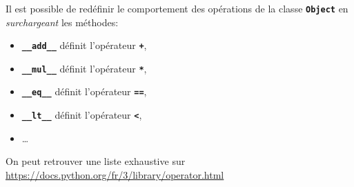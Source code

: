 \documentclass[svgnames,11pt]{beamer}
\begin{document}
\begin{frame}
    \frametitle{}
    Il est possible de redéfinir le comportement des opérations de la classe \textbf{\texttt{Object}} en \emph{surchargeant} les méthodes:
    \begin{itemize}
        \item  \textbf{\texttt{\_\_add\_\_}} définit l'opérateur \textbf{\texttt{+}},
        \item  \textbf{\texttt{\_\_mul\_\_}} définit l'opérateur \textbf{\texttt{*}},
        \item \textbf{\texttt{\_\_eq\_\_}} définit l'opérateur \textbf{\texttt{==}},
        \item \textbf{\texttt{\_\_lt\_\_}} définit l'opérateur \textbf{\texttt{<}},
        \item \dots
    \end{itemize}
    On peut retrouver une liste exhaustive sur \url{https://docs.python.org/fr/3/library/operator.html}

\end{frame}
\end{document}

